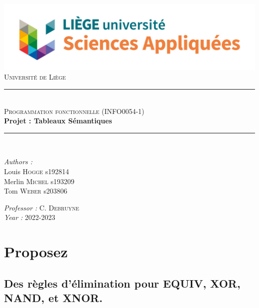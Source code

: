 \documentclass[a4paper, 11pt]{article}
\newcommand{\HRule}{\rule{\linewidth}{0.5mm}}
\begin{document}
\begin{titlepage}

\begin{center}
\includegraphics[scale = 0.35]{logo.jpg}\\
\vspace{1cm}
\textsc{\huge Université de Liège}\\[1.2cm]
\HRule \\[1cm]
\textsc{\LARGE Programmation fonctionnelle (INFO0054-1) }\\[1cm]
{\Huge \bfseries Projet : Tableaux Sémantiques}\\[1.4cm] 
\HRule \\[1cm]
\end{center}

\begin{minipage}{0.45\linewidth}
      \begin{flushleft} \large
        \emph{Authors : } \\
        Louis \textsc{Hogge}  s192814\\
        Merlin \textsc{Michel}  s193209\\
        Tom \textsc{Weber}  s203806
      \end{flushleft}
\end{minipage}
\hfill
\begin{minipage}{0.45\linewidth}
      \begin{flushright} \large
        \emph{Professor : } C. \textsc{Debruyne}\\
        \emph{Year : } 2022-2023 
      \end{flushright}
\end{minipage}

\end{titlepage}

\newpage

\section{Proposez}
\subsection{Des règles d’élimination pour EQUIV, XOR, NAND,
et XNOR.}
\end{document}
